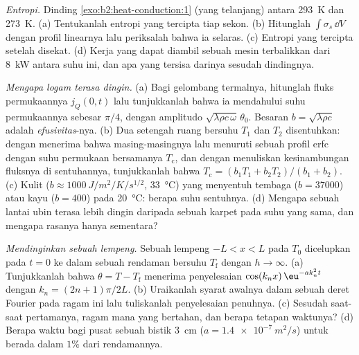 \begin{exercise}[$\star\star\star$]\label{exo:b2:heat-conduction:10}
\emph{Entropi.} Dinding \cref{exo:b2:heat-conduction:1} (yang telanjang)
antara \qty{293}{K} dan \qty{273}{K}. (a) Tentukanlah entropi yang tercipta tiap sekon.
(b) Hitunglah $\int\sigma_s\,\dd V$ dengan profil linearnya lalu periksalah bahwa ia
selaras. (c) Entropi yang tercipta setelah disekat. (d) Kerja yang dapat
diambil sebuah mesin terbalikkan dari \qty{8}{kW} antara
suhu ini, dan apa yang tersisa darinya sesudah dindingnya.
\end{exercise}

\begin{exercise}[$\star\star\star$]\label{exo:b2:heat-conduction:11}
\emph{Mengapa logam terasa dingin.} (a) Bagi gelombang termalnya, hitunglah
fluks permukaannya $j_Q(0,t)$ lalu tunjukkanlah bahwa ia mendahului suhu permukaannya sebesar
$\pi/4$, dengan amplitudo $\sqrt{\lambda\rho c\,\omega}\,\theta_0$. Besaran
$b = \sqrt{\lambda\rho c}$ adalah \emph{efusivitas}-nya. (b) Dua
setengah ruang bersuhu $T_1$ dan $T_2$ disentuhkan: dengan menerima bahwa
masing-masingnya lalu menuruti sebuah profil erfc dengan suhu permukaan bersamanya
$T_{\text{c}}$, dan dengan menuliskan kesinambungan fluksnya di sentuhannya,
tunjukkanlah bahwa $T_{\text{c}} = (b_1T_1 + b_2T_2)/(b_1 + b_2)$. (c) Kulit
($b \approx \qty{1000}{J/m^2/K/s^{1/2}}$, \qty{33}{\celsius}) yang menyentuh
tembaga ($b = 37000$) atau kayu ($b = 400$) pada \qty{20}{\celsius}: berapa suhu
sentuhnya. (d) Mengapa sebuah lantai ubin terasa lebih dingin daripada sebuah karpet pada
suhu yang sama, dan mengapa rasanya hanya sementara?
\end{exercise}

\begin{exercise}[$\star\star\star$]\label{exo:b2:heat-conduction:12}
\emph{Mendinginkan sebuah lempeng.} Sebuah lempeng $-L < x < L$ pada $T_0$ dicelupkan pada $t =
0$ ke dalam sebuah rendaman bersuhu $T_{\text{f}}$ dengan $h \to \infty$. (a) Tunjukkanlah bahwa $\theta =
T - T_{\text{f}}$ menerima penyelesaian $\cos(k_nx)\,\eu^{-ak_n^2t}$ dengan $k_n
= (2n+1)\pi/2L$. (b) Uraikanlah syarat awalnya dalam sebuah deret Fourier
pada ragam ini lalu tuliskanlah penyelesaian penuhnya. (c) Sesudah saat-saat
pertamanya, ragam mana yang bertahan, dan berapa tetapan waktunya? (d) Berapa waktu
bagi pusat sebuah bistik \qty{3}{cm} ($a = \qty{1.4e-7}{m^2/s}$) untuk berada
dalam $1\%$ dari rendamannya.
\end{exercise}

